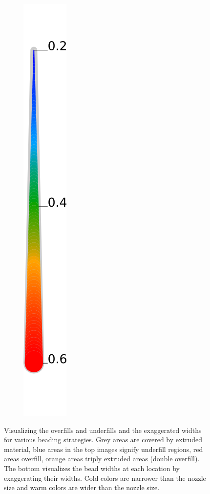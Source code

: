 \begin{figure}
\begin{subfigure}{.04\columnwidth}
\includegraphics[height=\figheight]{sources/validation/gMAT_example/widths_legend.png}
\end{subfigure}
\caption{
Visualizing the overfills and underfills and the exaggerated widths for various beading strategies.
Grey areas are covered by extruded material,
blue areas in the top images signify underfill regions,
red areas overfill,
orange areas triply extruded areas (double overfill).
The bottom visualizes the bead widths at each location by exaggerating their widths.
Cold colors are narrower than the nozzle size and warm colors are wider than the nozzle size.
}
\label{visualized_accuracy}
\end{figure}








